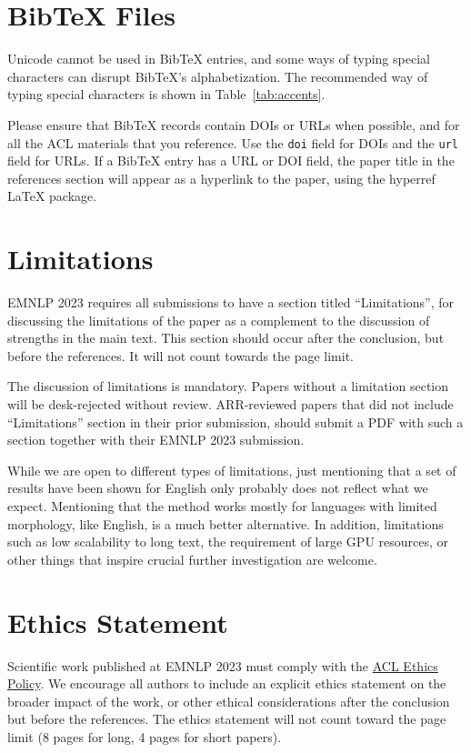 \documentclass[11pt]{article}
\begin{document}
\section{Bib\TeX{} Files}
\label{sec:bibtex}

Unicode cannot be used in Bib\TeX{} entries, and some ways of typing special characters can disrupt Bib\TeX's alphabetization. The recommended way of typing special characters is shown in Table~\ref{tab:accents}.

Please ensure that Bib\TeX{} records contain DOIs or URLs when possible, and for all the ACL materials that you reference.
Use the \verb|doi| field for DOIs and the \verb|url| field for URLs.
If a Bib\TeX{} entry has a URL or DOI field, the paper title in the references section will appear as a hyperlink to the paper, using the hyperref \LaTeX{} package.

\section*{Limitations}
EMNLP 2023 requires all submissions to have a section titled ``Limitations'', for discussing the limitations of the paper as a complement to the discussion of strengths in the main text. This section should occur after the conclusion, but before the references. It will not count towards the page limit.  

The discussion of limitations is mandatory. Papers without a limitation section will be desk-rejected without review.
ARR-reviewed papers that did not include ``Limitations'' section in their prior submission, should submit a PDF with such a section together with their EMNLP 2023 submission.

While we are open to different types of limitations, just mentioning that a set of results have been shown for English only probably does not reflect what we expect. 
Mentioning that the method works mostly for languages with limited morphology, like English, is a much better alternative.
In addition, limitations such as low scalability to long text, the requirement of large GPU resources, or other things that inspire crucial further investigation are welcome.

\section*{Ethics Statement}
Scientific work published at EMNLP 2023 must comply with the \href{https://www.aclweb.org/portal/content/acl-code-ethics}{ACL Ethics Policy}. We encourage all authors to include an explicit ethics statement on the broader impact of the work, or other ethical considerations after the conclusion but before the references. The ethics statement will not count toward the page limit (8 pages for long, 4 pages for short papers).
\end{document}
